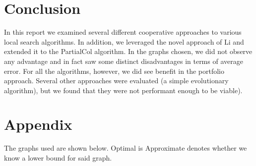 \documentclass[runningheads]{llncs}
\begin{document}
\section{Conclusion}
In this report we examined several different cooperative approaches to various local search algorithms. In addition, we leveraged the novel approach of Li and extended it to the PartialCol algorithm. In the graphs chosen, we did not observe any advantage and in fact saw some distinct disadvantages in terms of average error. For all the algorithms, however, we did see benefit in the portfolio approach. Several other approaches were evaluated (a simple evolutionary algorithm), but we found that they were not performant enough to be viable). 


\section{Appendix}

The graphs used are shown below. Optimal is Approximate denotes whether we know a lower bound for said graph. 
\end{document}
